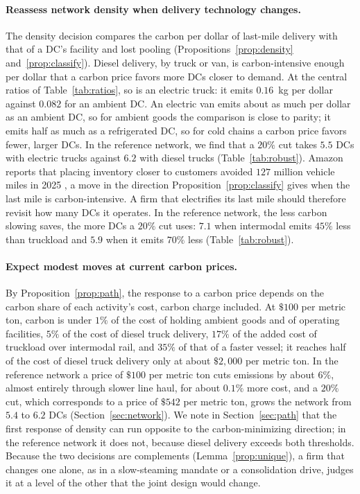 \documentclass[11pt]{article}
\numberwithin{proposition}{section}
\theoremstyle{definition}
\theoremstyle{remark}
\theoremstyle{plain}
\begin{document}
\paragraph{Reassess network density when delivery technology changes.} The density decision compares the carbon
per dollar of last-mile delivery with that of a DC's facility and lost pooling
(Propositions~\ref{prop:density} and~\ref{prop:classify}). Diesel delivery, by truck or van, is carbon-intensive enough per dollar that a carbon price favors more
DCs closer to demand. At the central ratios of Table~\ref{tab:ratios}, so is an electric truck: it emits $0.16$~kg per
dollar against $0.082$ for an ambient DC. An electric van emits about as much per dollar as an ambient DC,
so for ambient goods the comparison is close to parity; it emits half as much as a refrigerated DC, so for cold
chains a carbon price favors fewer, larger DCs. In the reference network, we find that a $20\%$ cut takes $5.5$
DCs with electric trucks against $6.2$ with diesel trucks (Table~\ref{tab:robust}). Amazon reports that placing inventory closer to customers
avoided $127$ million vehicle miles in 2025 \citep{amazon2025sustainability}, a move in the direction
Proposition~\ref{prop:classify} gives when the last mile is carbon-intensive. A firm that electrifies its last
mile should therefore revisit how many DCs it operates. In the reference network, the less carbon slowing saves, the more DCs a $20\%$ cut uses: $7.1$ when
intermodal emits $45\%$ less than truckload and $5.9$ when it emits $70\%$ less (Table~\ref{tab:robust}).

\paragraph{Expect modest moves at current carbon prices.} By Proposition~\ref{prop:path}, the response to a
carbon price depends on the carbon share of each activity's cost, carbon charge included. At $\$100$ per metric ton,
carbon is under $1\%$ of the cost of holding ambient goods and of operating facilities, $5\%$ of the
cost of diesel truck delivery, $17\%$ of the added cost of truckload over intermodal rail, and $35\%$ of that of a faster vessel; it reaches half of the cost of diesel truck delivery only at about $\$2{,}000$ per metric ton. In the reference network a price of $\$100$ per metric ton cuts emissions by about $6\%$, almost entirely
through slower line haul, for about $0.1\%$ more cost, and a $20\%$ cut, which corresponds to a price of $\$542$ per
metric ton, grows the network from $5.4$ to $6.2$ DCs (Section~\ref{sec:network}). We note in
Section~\ref{sec:path} that the first response of density can run opposite to the carbon-minimizing direction;
in the reference network it does not, because diesel delivery exceeds both thresholds. Because the two decisions are complements (Lemma~\ref{prop:unique}), a firm that changes one
alone, as in a slow-steaming mandate or a consolidation drive, judges it at a level of the other that the joint
design would change.
\end{document}
